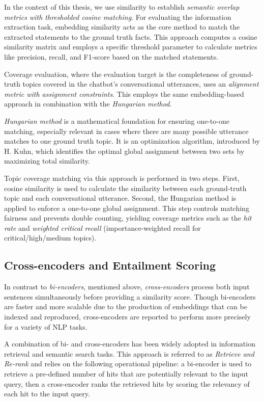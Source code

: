 In the context of this thesis, we use similarity to establish \textit{semantic overlap metrics with thresholded cosine matching}. 
For evaluating the information extraction task, embedding similarity acts as the core method to match the extracted statements to the ground truth facts. 
This approach computes a cosine similarity matrix and employs a specific threshold parameter to calculate metrics like precision, recall, and F1-score based on the matched statements.

Coverage evaluation, where the evaluation target is the completeness of ground-truth topics covered in the chatbot's conversational utterances, uses an \textit{alignment metric with assignment constraints}. 
This employs the same embedding-based approach in combination with the \textit{Hungarian method}.

\textit{Hungarian method} is a mathematical foundation for ensuring one-to-one matching, especially relevant in cases where there are many possible utterance matches to one ground truth topic.
It is an optimization algorithm, introduced by H. Kuhn\cite{kuhnHungarianMethodAssignment1955}, which identifies the optimal global assignment between two sets by maximizing total similarity.

Topic coverage matching via this approach is performed in two steps. 
First, cosine similarity is used to calculate the similarity between each ground-truth topic and each conversational utterance. Second, the Hungarian method is applied to enforce a one-to-one global assignment. This step controls matching fairness and prevents double counting, yielding coverage metrics such as the \textit{hit rate} and \textit{weighted critical recall} (importance-weighted recall for critical/high/medium topics).

\subsection{Cross-encoders and Entailment Scoring}

In contrast to \textit{bi-encoders}, mentioned above, \textit{cross-encoders} process both input sentences simultaneously before providing a similarity score. 
Though bi-encoders are faster and more scalable due to the production of embeddings that can be indexed and reproduced, cross-encoders are reported to perform more precisely for a variety of NLP tasks\cite{reimersSentenceBERTSentenceEmbeddings2019a}.

A combination of bi- and cross-encoders has been widely adopted in information retrieval and semantic search tasks. This approach is referred to as \textit{Retrieve and Re-rank} and relies on the following operational pipeline:
a bi-encoder is used to retrieve a pre-defined number of hits that are potentially relevant to the input query, then a cross-encoder ranks the retrieved hits by scoring the relevancy of each hit to the input query.

